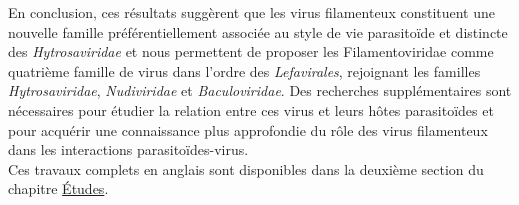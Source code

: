 En conclusion, ces résultats suggèrent que les virus filamenteux constituent une nouvelle famille préférentiellement associée au style de vie parasitoïde et distincte des \textit{Hytrosaviridae} et nous permettent de proposer les Filamentoviridae comme quatrième famille de virus dans l'ordre des \textit{Lefavirales}, rejoignant les familles \textit{Hytrosaviridae}, \textit{Nudiviridae} et \textit{Baculoviridae}. Des recherches supplémentaires sont nécessaires pour étudier la relation entre ces virus et leurs hôtes parasitoïdes et pour acquérir une connaissance plus approfondie du rôle des virus filamenteux dans les interactions parasitoïdes-virus. \\

Ces travaux complets en anglais sont disponibles dans la deuxième section du chapitre \hyperref[sec:chap2]{Études}. 

